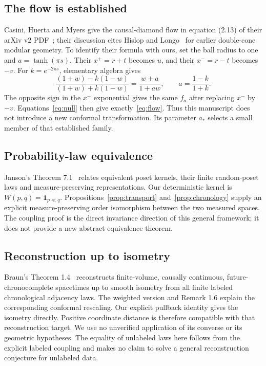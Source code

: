 \documentclass[11pt]{article}
\theoremstyle{remark}
\begin{document}
\subsection{The flow is established}
Casini, Huerta and Myers give the causal-diamond flow in
equation (2.13) of their arXiv v2 PDF~\cite{CHM}; their discussion
cites Hislop and Longo~\cite{HL} for earlier double-cone modular
geometry. To identify their formula with ours, set the ball radius
to one and $a=\tanh(\pi s)$. Their $x^+=r+t$ becomes $u$,
and their $x^-=r-t$ becomes $-v$.
For $k=e^{-2\pi s}$, elementary algebra gives
\[
 \frac{(1+w)-k(1-w)}{(1+w)+k(1-w)}
 =\frac{w+a}{1+aw},\qquad a=\frac{1-k}{1+k}.
\]
The opposite sign in the $x^-$ exponential gives the same $f_a$
after replacing $x^-$ by $-v$. Equations~\eqref{eq:null} then give
exactly~\eqref{eq:flow}. Thus this manuscript does not introduce a
new conformal transformation. Its parameter $a_*$ selects a small
member of that established family.

\subsection{Probability-law equivalence}
Janson's Theorem 7.1~\cite{Janson} relates equivalent poset kernels,
their finite random-poset laws and measure-preserving representations.
Our deterministic kernel is $W(p,q)=\mathbf1_{p\ll q}$.
Propositions~\ref{prop:transport} and~\ref{prop:chronology} supply an
explicit measure-preserving order isomorphism between the two measured
spaces. The coupling proof is the direct invariance direction of this
general framework; it does not provide a new abstract equivalence theorem.

\subsection{Reconstruction up to isometry}
Braun's Theorem 1.4~\cite{Braun} reconstructs finite-volume, causally
continuous, future-chronocomplete spacetimes up to smooth isometry from
all finite labeled chronological adjacency laws. The weighted version
and Remark 1.6 explain the corresponding conformal rescaling.
Our explicit pullback identity gives the isometry directly. Positive
coordinate distance is therefore compatible with that reconstruction
target. We use no unverified application of its converse or its
geometric hypotheses. The equality of unlabeled laws here follows
from the explicit labeled coupling and makes no claim to solve a
general reconstruction conjecture for unlabeled data.
\end{document}
